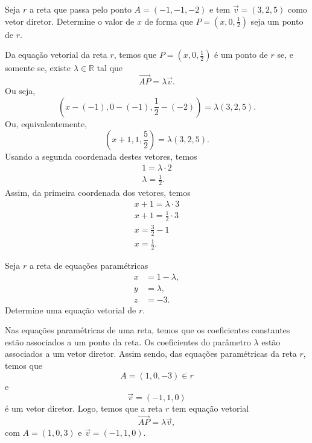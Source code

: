 \begin{exeresol}
  Seja $r$ a reta que passa pelo ponto $A = (-1,-1,-2)$ e tem $\vec{v} = (3,2,5)$ como vetor diretor. Determine o valor de $x$ de forma que $P = \left(x, 0, \frac{1}{2}\right)$ seja um ponto de $r$.
\end{exeresol}
\begin{resol}
  Da equação vetorial da reta $r$, temos que $P = \left(x,0,\frac{1}{2}\right)$ é um ponto de $r$ se, e somente se, existe $\lambda\in\mathbb{R}$ tal que
  \begin{equation}
    \overrightarrow{AP} = \lambda\vec{v}.
  \end{equation}
  Ou seja,
  \begin{equation}
    \left(x-(-1),0-(-1),\frac{1}{2}-(-2)\right) = \lambda (3,2,5).
  \end{equation}
  Ou, equivalentemente,
  \begin{equation}
    \left(x+1,1,\frac{5}{2}\right) = \lambda (3,2,5).
  \end{equation}
  Usando a segunda coordenada destes vetores, temos
  \begin{gather}
    1 = \lambda\cdot 2\\
    \lambda = \frac{1}{2}.
  \end{gather}
  Assim, da primeira coordenada dos vetores, temos
  \begin{gather}
    x+1 = \lambda\cdot 3 \\
    x+1 = \frac{1}{2}\cdot 3\\
    x = \frac{3}{2}-1\\
    x= \frac{1}{2}.
  \end{gather}
\end{resol}

\begin{exeresol}
  Seja $r$ a reta de equações paramétricas
  \begin{align}
    x &= 1 -\lambda,\\
    y &= \lambda,\\
    z &= -3.
  \end{align}
  Determine uma equação vetorial de $r$.
\end{exeresol}
\begin{resol}
  Nas equações paramétricas de uma reta, temos que os coeficientes constantes estão associados a um ponto da reta. Os coeficientes do parâmetro $\lambda$ estão associados a um vetor diretor. Assim sendo, das equações paramétricas da reta $r$, temos que
  \begin{equation}
    A = (1,0,-3)\in r
  \end{equation}
  e
  \begin{equation}
    \vec{v} = (-1,1,0)
  \end{equation}
  é um vetor diretor. Logo, temos que a reta $r$ tem equação vetorial
  \begin{equation}
    \overrightarrow{AP} = \lambda\vec{v},
  \end{equation}
  com $A = (1,0,3)$ e $\vec{v} = (-1,1,0)$.
\end{resol}

